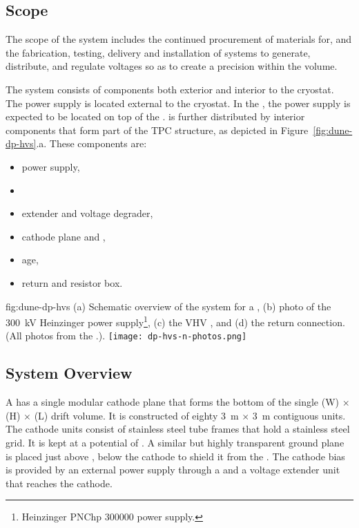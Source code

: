 \subsection{Scope}
\label{sec:fddp-hv-scope}
The scope of the  system 
includes the continued procurement of materials for, and the fabrication, testing, delivery and installation of systems to generate, distribute, and regulate voltages so as to create a precision \efield within the \detmodule volume. 

The  system consists of components both exterior and interior to the cryostat. The  power supply is located external to the cryostat.  In the , the  power supply is expected to be located on top of the  \fdth.  is further distributed by interior components that form part of the TPC structure, as depicted in Figure~\ref{fig:dune-dp-hvs}.a.  These components are:

\begin{itemize}
\item power supply,
\item {} \fdth
\item {} extender and voltage degrader,
\item cathode plane and , 
\item {}age{},
\item {} return \fdth and resistor box.
\end{itemize}


\begin{dunefigure}
{fig:dune-dp-hvs}
{(a) Schematic overview of the  system for a \dpmod{}, 
(b) photo of the \SI{300}{\kV} Heinzinger power supply\footnote{Heinzinger\texttrademark{} PNChp 300000 power supply.}, (c) the VHV \fdth{}, and (d) the  return connection. (All photos from the .).}
\texttt{[image: dp-hvs-n-photos.png]}
\end{dunefigure}

\subsection{System Overview}

A \dpmod  has a single modular cathode plane that forms the bottom of the single
  \dptpcwdth (W) $\times$ \tpcheight (H) $\times$ \dptpclen (L) drift volume. It is constructed of eighty \SI{3}{\m} $\times$ \SI{3}{\m} contiguous units. 
The cathode units consist of stainless steel tube frames that hold a stainless steel grid. It is kept at a potential of \dptargetdriftvoltneg.  A similar but highly transparent ground plane is placed just above , below the cathode to shield it from the .
The cathode bias is provided by an external  power supply through a  \fdth and a voltage extender unit that reaches the cathode.
 
